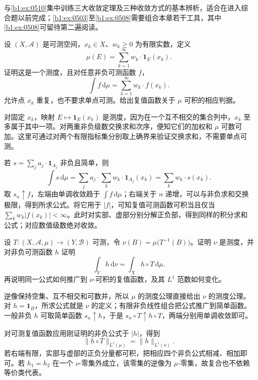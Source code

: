 \BookExercises

与\cref{b1:ex:0510}集中训练三大收敛定理及三种收敛方式的基本辨析，适合在进入综合题以前完成；\cref{b1:ex:0503}至\cref{b1:ex:0508}需要组合本章若干工具，其中\cref{b1:ex:0508}可留待第二遍阅读。

\begin{exercise}\label{b1:ex:0501}
设 \((X,\mathcal A)\) 是可测空间，\(x_k\in X\)、\(w_k\geq0\) 为有限实数，定义
\[
\mu(E)=\sum_{k=1}^{\infty}w_k\cdot\mathbf1_E(x_k).
\]
证明这是一个测度，且对任意非负可测函数 \(f\)，
\[
\int f\,\mathrm d\mu=\sum_{k=1}^{\infty}w_k\cdot f(x_k).
\]
允许点 \(x_k\) 重复，也不要求单点可测。给出复值函数关于 \(\mu\) 可积的相应判据。
\end{exercise}
\begin{solution}
对固定 \(x_k\)，映射 \(E\mapsto\mathbf1_E(x_k)\) 是测度，因为在一个互不相交的集合列中，\(x_k\) 至多属于其中一项。对两重非负级数交换求和次序，便知它们的加权和 \(\mu\) 可数可加。这里可通过对两个有限指标集分别取上确界来验证交换求和，不需要单点可测。

若 \(s=\sum_ja_j\cdot\mathbf1_{A_j}\) 非负且简单，则
\[
\int s\,\mathrm d\mu
=\sum_j a_j\cdot\sum_k w_k\cdot\mathbf1_{A_j}(x_k)
=\sum_k w_k\cdot s(x_k).
\]
取 \(s_n\uparrow f\)，左端由单调收敛趋于 \(\int f\,\mathrm d\mu\)；右端关于 \(n\) 递增，可以与非负求和交换极限，得到所求公式。将它用于 \(|f|\)，可知复值可测函数可积当且仅当
\(\sum_kw_k|f(x_k)|<\infty\)。此时对实部、虚部分别分解正负部，得到同样的积分求和公式；对应数值级数绝对收敛。
\end{solution}

\begin{exercise}\label{b1:ex:0502}
设 \(T:(X,\mathcal A,\mu)\rightarrow(Y,\mathcal B)\) 可测，令
\(\nu(B)=\mu\bigl(T^{-1}(B)\bigr)\)。证明 \(\nu\) 是测度，并对非负可测函数 \(h\) 证明
\[
\int_Yh\,\mathrm d\nu=\int_X h\circ T\,\mathrm d\mu.
\]
再说明同一公式如何推广到 \(\nu\)-可积的复值函数，及其 \(L^1\) 范数如何变化。
\end{exercise}
\begin{solution}
逆像保持空集、互不相交和可数并，所以 \(\mu\) 的测度公理直接给出 \(\nu\) 的测度公理。对 \(h=\mathbf1_B\)，所求公式就是 \(\nu\) 的定义；有限非负线性组合把公式推广到简单函数。一般非负 \(h\) 可取简单函数 \(s_n\uparrow h\)，于是 \(s_n\circ T\uparrow h\circ T\)，两端分别用单调收敛即可。

对可测复值函数应用刚证明的非负公式于 \(|h|\)，得到
\[
\|h\circ T\|_{L^1(\mu)}=\|h\|_{L^1(\nu)}.
\]
若右端有限，实部与虚部的正负分量都可积，把相应四个非负公式相减、相加即可。若 \(h_1=h_2\) 在一个 \(\nu\)-零集外成立，该零集的逆像为 \(\mu\)-零集，故复合也不依赖等价类代表。
\end{solution}

